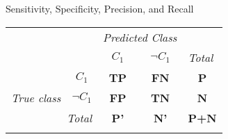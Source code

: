 \begin{frame}{Sensitivity, Specificity, Precision, and Recall}

	\vspace*{-1.5em}

	\begin{center}
		\begin{tabular}{lp{1cm}p{1cm}p{1cm}p{1cm}}
			                                                           &                                                                & \multicolumn{2}{c}{\textit{Predicted Class}}              & \multicolumn{1}{l}{}                                                                                \\ \cline{3-4}
			                                                           & \multicolumn{1}{l|}{}                                          & \multicolumn{1}{c|}{\cellcolor{faugray!62}\textbf{$C_1$}} & \multicolumn{1}{c|}{\cellcolor{faugray!62}\textbf{$\neg C_1$}} & \multicolumn{1}{l}{\textit{Total}} \\ \cline{2-5}
			\multicolumn{1}{c|}{}                                      & \multicolumn{1}{c|}{\cellcolor{faugray!62}\textbf{$C_1$}}      & \multicolumn{1}{c|}{\textbf{TP}}                          & \multicolumn{1}{c|}{\textbf{FN}}                               & \multicolumn{1}{c}{\textbf{P}}     \\ \cline{2-4}
			\multicolumn{1}{c|}{\multirow{-2}{*}{\textit{True class}}} & \multicolumn{1}{c|}{\cellcolor{faugray!62}\textbf{$\neg C_1$}} & \multicolumn{1}{c|}{\textbf{FP}}                          & \multicolumn{1}{c|}{\textbf{TN}}                               & \multicolumn{1}{c}{\textbf{N}}     \\ \cline{2-5}
			\multicolumn{2}{r|}{\textit{Total}}                        & \multicolumn{1}{c}{\textbf{P'}}                                & \multicolumn{1}{c|}{\textbf{N'}}                          & \multicolumn{1}{c}{\textbf{P+N}}                                                                    \\
			                                                           &                                                                &                                                           &                                                                &
		\end{tabular}
	\end{center}

	\vspace*{-0.5cm}


\end{frame}
